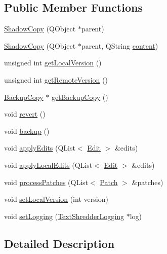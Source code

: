 \subsection*{Public Member Functions}
\begin{DoxyCompactItemize}
\item 
\hyperlink{class_shadow_copy_a113c966f7daed0ffb99f7a57561a7801}{ShadowCopy} (QObject $\ast$parent)
\item 
\hyperlink{class_shadow_copy_ac5fc9ad047d2690a72ab538dcd6ab4f7}{ShadowCopy} (QObject $\ast$parent, QString \hyperlink{class_patchable_a4c55c830faef821364995f097c96d34d}{content})
\item 
unsigned int \hyperlink{class_shadow_copy_a53ea25db19b20a6770e60d81a6b507f4}{getLocalVersion} ()
\item 
unsigned int \hyperlink{class_shadow_copy_a4bfafd0823dbc2788c936608ec22ea54}{getRemoteVersion} ()
\item 
\hyperlink{class_backup_copy}{BackupCopy} $\ast$ \hyperlink{class_shadow_copy_a5ed0b6e1f144468afca9129449a35fbc}{getBackupCopy} ()
\item 
void \hyperlink{class_shadow_copy_aafdb5f83bfac6e782fee171272883a56}{revert} ()
\item 
void \hyperlink{class_shadow_copy_a7c6bfe84627fa3d8afd1b5a09fde6a0e}{backup} ()
\item 
void \hyperlink{class_shadow_copy_a536db8c68e3b5cf89b30b609012fb13a}{applyEdits} (QList$<$ \hyperlink{class_edit}{Edit} $>$ \&edits)
\item 
void \hyperlink{class_shadow_copy_a222d6d0835c4dea04c5f3d4a4ebf6e82}{applyLocalEdits} (QList$<$ \hyperlink{class_edit}{Edit} $>$ \&edits)
\item 
void \hyperlink{class_shadow_copy_a2af9f4a92de936eb8856d05d5499a185}{processPatches} (QList$<$ \hyperlink{class_patch}{Patch} $>$ \&patches)
\item 
void \hyperlink{class_shadow_copy_a434a5dc5be342886362d005f98831fe0}{setLocalVersion} (int version)
\item 
void \hyperlink{class_shadow_copy_af50ac8c141db70dc5a4311de5790ccf9}{setLogging} (\hyperlink{class_text_shredder_logging}{TextShredderLogging} $\ast$log)
\end{DoxyCompactItemize}


\subsection{Detailed Description}


